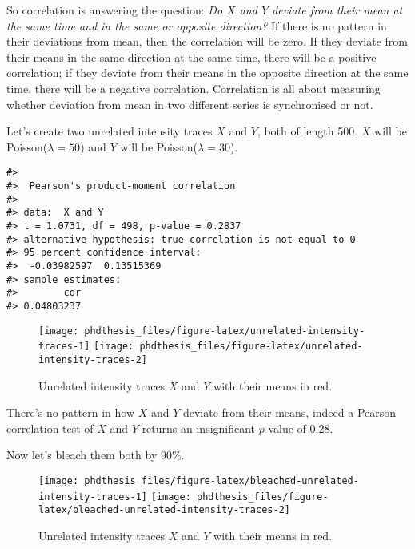 \documentclass[12pt,]{book}
\theoremstyle{definition}
\theoremstyle{definition}
\theoremstyle{definition}
\theoremstyle{remark}
\begin{document}
So correlation is answering the question: \emph{Do \(X\) and \(Y\)
deviate from their mean at the same time and in the same or opposite
direction?} If there is no pattern in their deviations from mean, then
the correlation will be zero. If they deviate from their means in the
same direction at the same time, there will be a positive correlation;
if they deviate from their means in the opposite direction at the same
time, there will be a negative correlation. Correlation is all about
measuring whether deviation from mean in two different series is
synchronised or not.

Let's create two unrelated intensity traces \(X\) and \(Y\), both of
length 500. \(X\) will be Poisson(\(\lambda = 50\)) and \(Y\) will be
Poisson(\(\lambda = 30\)).




\begin{verbatim}
#> 
#>  Pearson's product-moment correlation
#> 
#> data:  X and Y
#> t = 1.0731, df = 498, p-value = 0.2837
#> alternative hypothesis: true correlation is not equal to 0
#> 95 percent confidence interval:
#>  -0.03982597  0.13515369
#> sample estimates:
#>        cor 
#> 0.04803237
\end{verbatim}

\begin{figure}

\texttt{[image: phdthesis\_files/figure-latex/unrelated-intensity-traces-1]} \texttt{[image: phdthesis\_files/figure-latex/unrelated-intensity-traces-2]} \hfill{}

\caption{Unrelated intensity traces
\(X\) and \(Y\) with their means in red.}\label{fig:unrelated-intensity-traces}
\end{figure}

There's no pattern in how \(X\) and \(Y\) deviate from their means,
indeed a Pearson correlation test of \(X\) and \(Y\) returns an
insignificant \(p\)-value of 0.28.

Now let's bleach them both by 90\%.

\begin{figure}

\texttt{[image: phdthesis\_files/figure-latex/bleached-unrelated-intensity-traces-1]} \texttt{[image: phdthesis\_files/figure-latex/bleached-unrelated-intensity-traces-2]} \hfill{}

\caption{Unrelated intensity traces
\(X\) and \(Y\) with their means in red.}\label{fig:bleached-unrelated-intensity-traces}
\end{figure}
\end{document}
